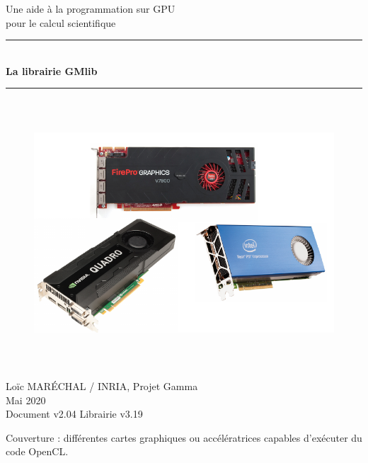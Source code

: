 \documentclass[a4paper,12pt]{article}
\newcommand{\HRule}{\rule{\linewidth}{1mm}}
\begin{document}
%
%

\begin{titlepage}

\begin{center}
\huge Une aide à la programmation sur GPU\\ pour le calcul scientifique
\HRule \\
\medskip
{\Huge \bfseries La librairie GMlib} \\
\HRule
\end{center}


\begin{figure}[htbp]
\begin{center}
\includegraphics[height=10cm]{gpu.pdf}
\end{center}
\end{figure}


\begin{flushright}
\Large Lo\"ic MAR\'ECHAL / INRIA, Projet Gamma\\
\Large Mai 2020 \\
\normalsize Document v2.04
\normalsize Librairie v3.19
\end{flushright}

\end{titlepage}

\clearpage

\setcounter{tocdepth}{2}
\tableofcontents
\vfill

\footnotesize{Couverture : différentes cartes graphiques ou accélératrices capables d'exécuter du code OpenCL.}
\normalsize
\end{document}
